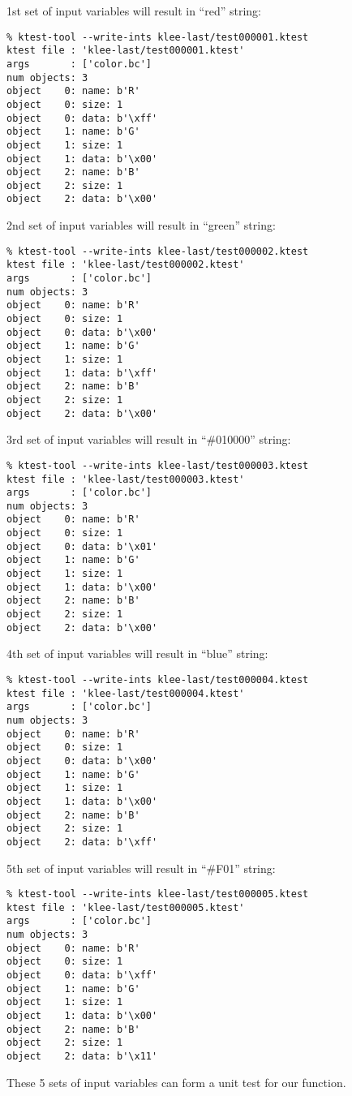 1st set of input variables will result in ``red'' string:

\begin{lstlisting}
% ktest-tool --write-ints klee-last/test000001.ktest
ktest file : 'klee-last/test000001.ktest'
args       : ['color.bc']
num objects: 3
object    0: name: b'R'
object    0: size: 1
object    0: data: b'\xff'
object    1: name: b'G'
object    1: size: 1
object    1: data: b'\x00'
object    2: name: b'B'
object    2: size: 1
object    2: data: b'\x00'
\end{lstlisting}

2nd set of input variables will result in ``green'' string:

\begin{lstlisting}
% ktest-tool --write-ints klee-last/test000002.ktest
ktest file : 'klee-last/test000002.ktest'
args       : ['color.bc']
num objects: 3
object    0: name: b'R'
object    0: size: 1
object    0: data: b'\x00'
object    1: name: b'G'
object    1: size: 1
object    1: data: b'\xff'
object    2: name: b'B'
object    2: size: 1
object    2: data: b'\x00'
\end{lstlisting}

3rd set of input variables will result in ``\#010000'' string:

\begin{lstlisting}
% ktest-tool --write-ints klee-last/test000003.ktest
ktest file : 'klee-last/test000003.ktest'
args       : ['color.bc']
num objects: 3
object    0: name: b'R'
object    0: size: 1
object    0: data: b'\x01'
object    1: name: b'G'
object    1: size: 1
object    1: data: b'\x00'
object    2: name: b'B'
object    2: size: 1
object    2: data: b'\x00'
\end{lstlisting}

4th set of input variables will result in ``blue'' string:

\begin{lstlisting}
% ktest-tool --write-ints klee-last/test000004.ktest
ktest file : 'klee-last/test000004.ktest'
args       : ['color.bc']
num objects: 3
object    0: name: b'R'
object    0: size: 1
object    0: data: b'\x00'
object    1: name: b'G'
object    1: size: 1
object    1: data: b'\x00'
object    2: name: b'B'
object    2: size: 1
object    2: data: b'\xff'
\end{lstlisting}

5th set of input variables will result in ``\#F01'' string:

\begin{lstlisting}
% ktest-tool --write-ints klee-last/test000005.ktest
ktest file : 'klee-last/test000005.ktest'
args       : ['color.bc']
num objects: 3
object    0: name: b'R'
object    0: size: 1
object    0: data: b'\xff'
object    1: name: b'G'
object    1: size: 1
object    1: data: b'\x00'
object    2: name: b'B'
object    2: size: 1
object    2: data: b'\x11'
\end{lstlisting}

These 5 sets of input variables can form a unit test for our function.

